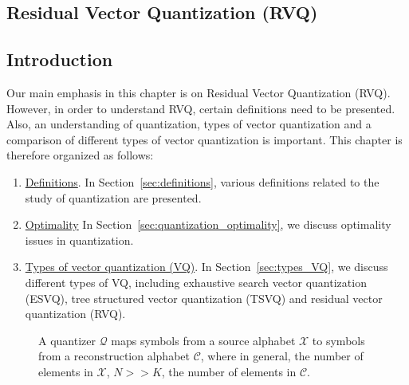 


\begin{FrontMatter}
\contents %
\end{FrontMatter}
\begin{Body}
\chapter{Residual Vector Quantization (RVQ)}
\label{chap_RVQ}	
\section{Introduction}
\label{sec:introduction}
Our main emphasis in this chapter is on Residual Vector Quantization (RVQ).  However, in order to understand RVQ, certain definitions need to be presented.  Also, an understanding of quantization, types of vector quantization and a comparison of different types of vector quantization is important.  This chapter is therefore organized as follows:

\begin{enumerate}
\item \underline{Definitions}.  In Section~\ref{sec:definitions}, various definitions related to the study of quantization are presented.
\item \underline{Optimality} In Section~\ref{sec:quantization_optimality}, we discuss optimality issues in quantization.
\item \underline{Types of vector quantization (VQ)}.  In Section~\ref{sec:types_VQ}, we discuss different types of VQ, including exhaustive search vector quantization (ESVQ),  tree structured vector quantization (TSVQ) and residual vector quantization (RVQ).
\end{enumerate}

								\begin{figure}[t]	
								\centering		
								\caption{A quantizer $\mathcal{Q}$ maps symbols from a source alphabet $\mathcal{X}$ to symbols from a reconstruction alphabet $\mathcal{C}$, where in general, the number of elements in $\mathcal{X}$, $N >> K$, the number of elements in $\mathcal{C}$.}
								\label{fig:Quantization_block_diagram}
								\end{figure}



\end{Body}
